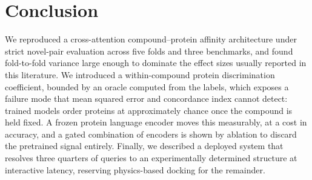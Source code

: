 \documentclass[conference]{IEEEtran}
\begin{document}
\section{Conclusion}

We reproduced a cross-attention compound--protein affinity architecture under strict novel-pair
evaluation across five folds and three benchmarks, and found fold-to-fold variance large enough to
dominate the effect sizes usually reported in this literature. We introduced a within-compound
protein discrimination coefficient, bounded by an oracle computed from the labels, which exposes a
failure mode that mean squared error and concordance index cannot detect: trained models order
proteins at approximately chance once the compound is held fixed. A frozen protein language encoder
moves this measurably, at a cost in accuracy, and a gated combination of encoders is shown by
ablation to discard the pretrained signal entirely. Finally, we described a deployed system that
resolves three quarters of queries to an experimentally determined structure at interactive
latency, reserving physics-based docking for the remainder.
\end{document}
